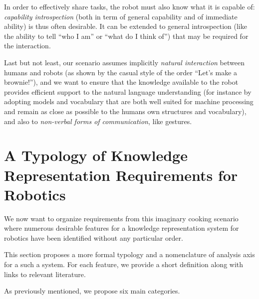 \documentclass[a4paper, twocolumn]{article}
\begin{document}
In order to effectively share tasks, the robot must also know what it is
capable of: \emph{capability introspection} (both in term of general capability
and of immediate ability) is thus often desirable. It can be extended to
general introspection (like the ability to tell ``who I am'' or ``what do I
think of'') that may be required for the interaction.

Last but not least, our scenario assumes implicitly \emph{natural interaction}
between humans and robots (as shown by the casual style of the order ``Let's
make a brownie!''), and we want to ensure that the
knowledge available to the robot provides efficient support to the natural
language understanding (for instance by adopting models and vocabulary that are
both well suited for machine processing and remain as close as possible to the
humans own structures and vocabulary), and also to \emph{non-verbal forms of
communication}, like gestures.

\section{A Typology of Knowledge Representation Requirements for Robotics}
\label{sect|features}

We now want to organize requirements from this imaginary cooking scenario where
numerous desirable features for a knowledge representation system for robotics
have been identified without any particular order.

This section proposes a more formal typology and a nomenclature of analysis
axis for a such a system. For each feature, we provide a short definition along
with links to relevant literature.

As previously mentioned, we propose six main categories.

\begin{scriptsize}
\begin{center}
\end{center}
\end{scriptsize}
\end{document}

